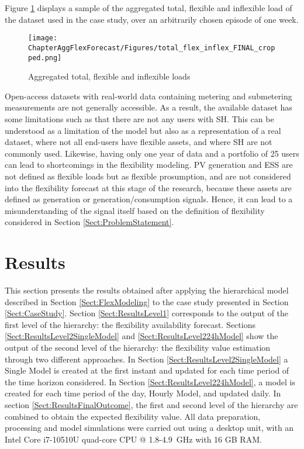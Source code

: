 Figure \ref{fig:agg_load} displays a sample of the aggregated total, flexible and inflexible load of the dataset used in the case study, over an arbitrarily chosen episode of one week. 

\begin{figure}[]
\centerline{\texttt{[image: ChapterAggFlexForecast/Figures/total\_flex\_inflex\_FINAL\_cropped.png]}}
\caption{Aggregated total, flexible and inflexible loads}
\label{fig:agg_load}
\end{figure}

Open-access datasets with real-world data containing metering and submetering measurements are not generally accessible. As a result, the available dataset has some limitations such as that there are not any users with SH. This can be understood as a limitation of the model but also as a representation of a real dataset, where not all end-users have flexible assets, and where SH are not commonly used.  Likewise, having only one year of data and a portfolio of 25 users can lead to shortcomings in the flexibility modeling. PV generation and ESS are not defined as flexible loads but as flexible prosumption, and are not considered into the flexibility forecast at this stage of the research, because these assets are defined as generation or generation/consumption signals. Hence, it can lead to a misunderstanding of the signal itself based on the definition of flexibility considered in Section \ref{Sect:ProblemStatement}. 


\section{Results} \label{sect:Results} 
This section presents the results obtained after applying the hierarchical model described in Section \ref{Sect:FlexModeling} to the case study presented in Section \ref{Sect:CaseStudy}. Section \ref{Sect:ResultsLevel1} corresponds to the output of the first level of the hierarchy: the flexibility availability forecast. Sections \ref{Sect:ResultsLevel2SingleModel} and \ref{Sect:ResultsLevel224hModel} show the output of the second level of the hierarchy: the flexibility value estimation through two different approaches. In Section \ref{Sect:ResultsLevel2SingleModel} a Single Model is created at the first instant and updated for each time period of the time horizon considered. In Section \ref{Sect:ResultsLevel224hModel}, a model is created for each time period of the day, Hourly Model, and updated daily. In section \ref{Sect:ResultsFinalOutcome}, the first and second level of the hierarchy are combined to obtain the expected flexibility value. All data preparation, processing and model simulations were carried out using a desktop unit, with an Intel Core i7-10510U quad-core CPU @  1.8-4.9~GHz with 16 GB RAM.

